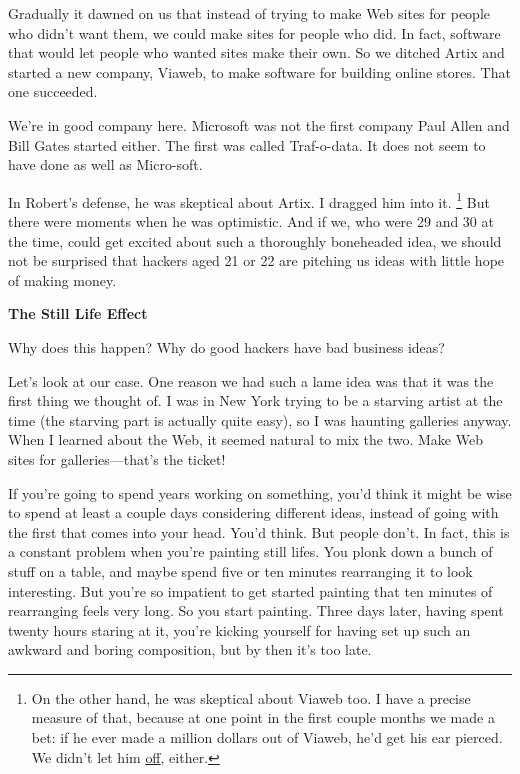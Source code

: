 Gradually it dawned on us that instead of trying to make Web sites for
people who didn't want them, we could make sites for people who did. In
fact, software that would let people who wanted sites make their own. So
we ditched Artix and started a new company, Viaweb, to make software for
building online stores. That one succeeded.

We're in good company here. Microsoft was not the first company Paul
Allen and Bill Gates started either. The first was called Traf-o-data.
It does not seem to have done as well as Micro-soft.

In Robert's defense, he was skeptical about Artix. I dragged him into
it. \footnote{On the other hand, he was skeptical about Viaweb too. I have a
precise measure of that, because at one point in the first couple months
we made a bet: if he ever made a million dollars out of Viaweb, he'd get
his ear pierced. We didn't let him \href{pierced.html}{off}, either.} But there were moments when he was
optimistic. And if we, who were 29 and 30 at the time, could get excited
about such a thoroughly boneheaded idea, we should not be surprised that
hackers aged 21 or 22 are pitching us ideas with little hope of making
money.

\textbf{The Still Life Effect}

Why does this happen? Why do good hackers have bad business ideas?

Let's look at our case. One reason we had such a lame idea was that it
was the first thing we thought of. I was in New York trying to be a
starving artist at the time (the starving part is actually quite easy),
so I was haunting galleries anyway. When I learned about the Web, it
seemed natural to mix the two. Make Web sites for galleries---that's the
ticket!

If you're going to spend years working on something, you'd think it
might be wise to spend at least a couple days considering different
ideas, instead of going with the first that comes into your head. You'd
think. But people don't. In fact, this is a constant problem when you're
painting still lifes. You plonk down a bunch of stuff on a table, and
maybe spend five or ten minutes rearranging it to look interesting. But
you're so impatient to get started painting that ten minutes of
rearranging feels very long. So you start painting. Three days later,
having spent twenty hours staring at it, you're kicking yourself for
having set up such an awkward and boring composition, but by then it's
too late.

